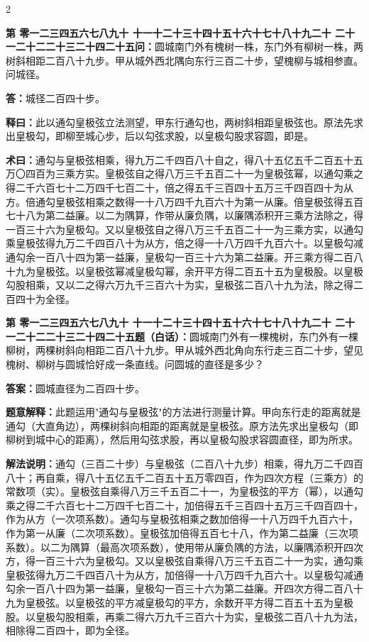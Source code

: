 \documentclass[10pt,a4paper]{article}
\newcounter{probnum}
\newcounter{probnumvol}[section]
\newcommand{\chnum}[1]{%
  \ifcase#1 零\or 一\or 二\or 三\or 四\or 五\or 六\or 七\or 八\or 九\or 十\or
    十一\or 十二\or 十三\or 十四\or 十五\or 十六\or 十七\or 十八\or 十九\or 二十\or
    二十一\or 二十二\or 二十三\or 二十四\or 二十五\fi}
\newcommand{\problemclassical}[1]{%
  \stepcounter{probnumvol}%
  \par\noindent
  \textcolor{classicalcolor}{\textbf{第\chnum{\value{probnumvol}}问：}}#1\par\smallskip
}
\newcommand{\problemmodern}[1]{%
  \par\noindent
  \textcolor{moderncolor}{\textbf{第\chnum{\value{probnumvol}}题（白话）：}}#1\par\smallskip
}
\newcommand{\answerclassical}[1]{%
  \par\noindent\textcolor{classicalcolor}{\textbf{答：}}#1\par
}
\newcommand{\answermodern}[1]{%
  \par\noindent\textcolor{moderncolor}{\textbf{答案：}}#1\par
}
\newcommand{\shiyiclassical}[1]{%
  \par\noindent\textcolor{classicalcolor}{\textbf{释曰：}}#1\par
}
\newcommand{\shiyimodern}[1]{%
  \par\noindent\textcolor{moderncolor}{\textbf{题意解释：}}#1\par
}
\newcommand{\shuyueclassical}[1]{%
  \par\noindent\textcolor{classicalcolor}{\textbf{术曰：}}#1\par
}
\newcommand{\shuyuemodern}[1]{%
  \par\noindent\textcolor{moderncolor}{\textbf{解法说明：}}#1\par
}
\begin{document}
\begin{paracol}{2}

\problemclassical{圆城南门外有槐树一株，东门外有柳树一株，两树斜相距二百八十九步。甲从城外西北隅向东行三百二十步，望槐柳与城相参直。问城径。}

\answerclassical{城径二百四十步。}

\shiyiclassical{此以通勾皇极弦立法测望，甲东行通勾也，两树斜相距皇极弦也。原法先求出皇极勾，即柳至城心步，后以勾弦求股，以皇极勾股求容圆，即是。}

\shuyueclassical{通勾与皇极弦相乘，得九万二千四百八十自之，得八十五亿五千二百五十五万〇四百为三乘方实。皇极弦自之得八万三千五百二十一为皇极弦幂，以通勾乘之得二千六百七十二万四千七百二十，倍之得五千三百四十五万三千四百四十为从方。倍通勾皇极弦相乘之数得一十八万四千九百六十为第一从廉。倍皇极弦得五百七十八为第二益廉。以二为隅算，作带从廉负隅，以廉隅添积开三乘方法除之，得一百三十六为皇极勾。又以皇极弦自之得八万三千五百二十一为三乘方实，以通勾乘皇极弦得九万二千四百八十为从方，倍之得一十八万四千九百六十。以皇极勾减通勾余一百八十四为第一益廉，皇极勾一百三十六为第二益廉。开三乘方得二百八十九为皇极弦。以皇极弦幂减皇极勾幂，余开平方得二百五十五为皇极股。以皇极勾股相乘，又以二之得六万九千三百六十为实，皇极弦二百八十九为法，除之得二百四十为全径。}

\switchcolumn

\problemmodern{圆城南门外有一棵槐树，东门外有一棵柳树，两棵树斜向相距二百八十九步。甲从城外西北角向东行走三百二十步，望见槐树、柳树与圆城恰好成一条直线。问圆城的直径是多少？}

\answermodern{圆城直径为二百四十步。}

\shiyimodern{此题运用"通勾与皇极弦"的方法进行测量计算。甲向东行走的距离就是通勾（大直角边），两棵树斜向相距的距离就是皇极弦。原方法先求出皇极勾（即柳树到城中心的距离），然后用勾弦求股，再以皇极勾股求容圆直径，即为所求。}

\shuyuemodern{通勾（三百二十步）与皇极弦（二百八十九步）相乘，得九万二千四百八十；再自乘，得八十五亿五千二百五十五万零四百，作为四次方程（三乘方）的常数项（实）。皇极弦自乘得八万三千五百二十一，为皇极弦的平方（幂），以通勾乘之得二千六百七十二万四千七百二十，加倍得五千三百四十五万三千四百四十，作为从方（一次项系数）。通勾与皇极弦相乘之数加倍得一十八万四千九百六十，作为第一从廉（二次项系数）。皇极弦加倍得五百七十八，作为第二益廉（三次项系数）。以二为隅算（最高次项系数），使用带从廉负隅的方法，以廉隅添积开四次方，得一百三十六为皇极勾。又以皇极弦自乘得八万三千五百二十一为实，通勾乘皇极弦得九万二千四百八十为从方，加倍得一十八万四千九百六十。以皇极勾减通勾余一百八十四为第一益廉，皇极勾一百三十六为第二益廉。开四次方得二百八十九为皇极弦。以皇极弦的平方减皇极勾的平方，余数开平方得二百五十五为皇极股。以皇极勾股相乘，再乘二得六万九千三百六十为实，皇极弦二百八十九为法，相除得二百四十，即为全径。}

\end{paracol}
\end{document}
